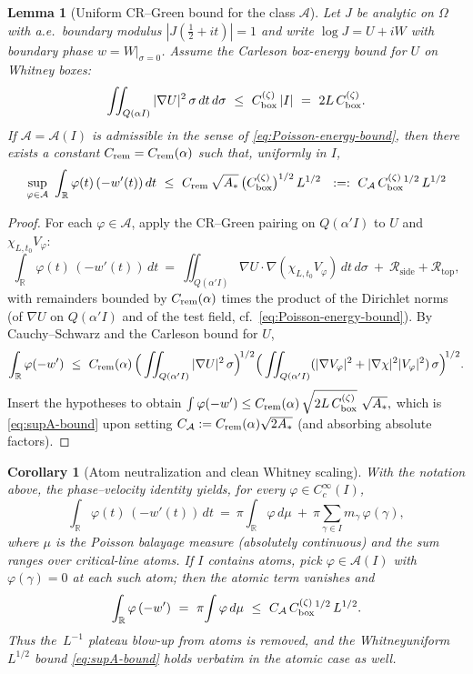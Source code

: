 \documentclass[11pt]{article}
\newtheorem{lemma}[theorem]{Lemma}
\newtheorem{corollary}[theorem]{Corollary}
\theoremstyle{definition}
\theoremstyle{remark}
\newcommand{\R}{\mathbb{R}}
\begin{document}
\begin{lemma}[Uniform CR--Green bound for the class \(\mathcal A\)]\label{lem:uniform-CRG-A}
Let \(J\) be analytic on \(\Omega\) with a.e.\ boundary modulus \(|J(\tfrac12+it)|=1\) and write \(\log J=U+iW\) with boundary phase \(w=W|_{\sigma=0}\).
Assume the Carleson box-energy bound for \(U\) on Whitney boxes:
\[
  \iint_{Q(\alpha I)} |\nabla U|^2\,\sigma\,dt\,d\sigma \ \le\ C_{\rm box}^{(\zeta)}\,|I|\ =\ 2L\,C_{\rm box}^{(\zeta)}.
\]
If \(\mathcal A=\mathcal A(I)\) is admissible in the sense of \eqref{eq:Poisson-energy-bound},
then there exists a constant \(C_{\rm rem}=C_{\rm rem}(\alpha)\) such that, uniformly in \(I\),
\begin{equation}\label{eq:supA-bound}
  \sup_{\varphi\in\mathcal A}\ \int_{\R} \varphi(t)\,(-w'(t))\,dt
  \ \le\ C_{\rm rem}\,\sqrt{A_\ast}\,\big(C_{\rm box}^{(\zeta)}\big)^{1/2}\,L^{1/2}
  \ \ :=:\ C_{\mathcal A}\,C_{\rm box}^{(\zeta)}{}^{1/2}\,L^{1/2}
\end{equation}
\end{lemma}


\begin{proof}
For each \(\varphi\in\mathcal A\), apply the CR--Green pairing on \(Q(\alpha'I)\) to \(U\) and \(\chi_{L,t_0}V_\varphi\):
\[
  \int_{\R}\varphi(t)\,(-w'(t))\,dt
  \ =\ \iint_{Q(\alpha'I)} \nabla U\cdot\nabla(\chi_{L,t_0}V_\varphi)\,dt\,d\sigma\ +\ \mathcal R_{\mathrm{side}}+\mathcal R_{\mathrm{top}},
\]
with remainders bounded by \(C_{\rm rem}(\alpha)\) times the product of the Dirichlet norms
(of \(\nabla U\) on \(Q(\alpha'I)\) and of the test field, cf.\ \eqref{eq:Poisson-energy-bound}).
By Cauchy--Schwarz and the Carleson bound for \(U\),
\[
  \int_{\R}\varphi(-w') \ \le\ C_{\rm rem}(\alpha)\,
  \Big(\iint_{Q(\alpha'I)} |\nabla U|^2\,\sigma\Big)^{\!1/2}
  \Big(\iint_{Q(\alpha'I)} (|\nabla V_\varphi|^2+|\nabla\chi|^2|V_\varphi|^2)\,\sigma\Big)^{\!1/2}.
\]
Insert the hypotheses to obtain
\(
\int \varphi(-w') \le C_{\rm rem}(\alpha)\,\sqrt{2L\,C_{\rm box}^{(\zeta)}}\ \sqrt{A_\ast},
\)
which is \eqref{eq:supA-bound} upon setting \(C_{\mathcal A}:=C_{\rm rem}(\alpha)\sqrt{2A_\ast}\) (and absorbing absolute factors).
\end{proof}


\begin{corollary}[Atom neutralization and clean Whitney scaling]\label{cor:atom-safe}
With the notation above, the phase--velocity identity yields, for every \(\varphi\in C_c^\infty(I)\),
\[
  \int_{\R}\varphi(t)\,(-w'(t))\,dt
  \ =\ \pi\!\int_{\R}\varphi\,d\mu\ +\ \pi\sum_{\gamma\in I} m_\gamma\,\varphi(\gamma),
\]
where \(\mu\) is the Poisson balayage measure (absolutely continuous) and the sum ranges over critical-line atoms.
If \(I\) contains atoms, pick \(\varphi\in\mathcal A(I)\) with \(\varphi(\gamma)=0\) at each such atom; then the atomic term vanishes and
\[
  \int_{\R}\varphi\,(-w')\ =\ \pi\!\int \varphi\,d\mu\ \le\ C_{\mathcal A}\,C_{\rm box}^{(\zeta)}{}^{1/2}\,L^{1/2}.
\]
Thus the \(\,L^{-1}\) plateau blow-up from atoms is removed, and the Whitney\-uniform \(L^{1/2}\) bound \eqref{eq:supA-bound}
holds verbatim in the atomic case as well.
\end{corollary}
\end{document}
